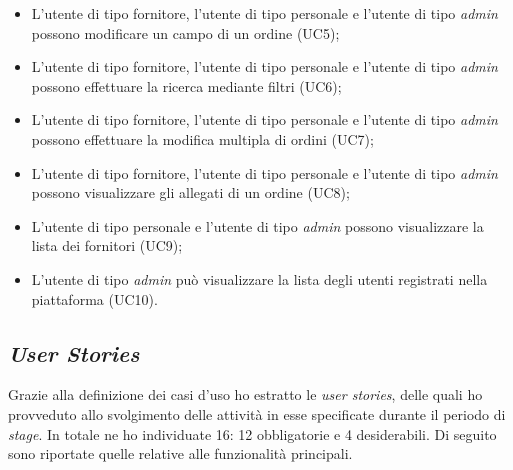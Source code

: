 \begin{itemize}
\begin{itemize}
      \item L'utente di tipo fornitore, l'utente di tipo personale e l'utente di tipo \emph{admin} possono modificare un campo di un ordine (UC5);
      \item L'utente di tipo fornitore, l'utente di tipo personale e l'utente di tipo \emph{admin} possono effettuare la ricerca mediante filtri (UC6);
      \item L'utente di tipo fornitore, l'utente di tipo personale e l'utente di tipo \emph{admin} possono effettuare la modifica multipla di ordini (UC7);
      \item L'utente di tipo fornitore, l'utente di tipo personale e l'utente di tipo \emph{admin} possono visualizzare gli allegati di un ordine (UC8);
      \item L'utente di tipo personale e l'utente di tipo \emph{admin} possono visualizzare la lista dei fornitori (UC9);
      \item L'utente di tipo \emph{admin} può visualizzare la lista degli utenti registrati nella piattaforma (UC10).
    \end{itemize}
\end{itemize}

\subsection{\emph{User Stories}}
Grazie alla definizione dei casi d'uso ho estratto le \emph{user stories}, delle quali ho provveduto allo svolgimento delle attività in esse specificate durante il periodo di \emph{stage}. 
In totale ne ho individuate 16: 12 obbligatorie e 4 desiderabili.
Di seguito sono riportate quelle relative alle funzionalità principali.

